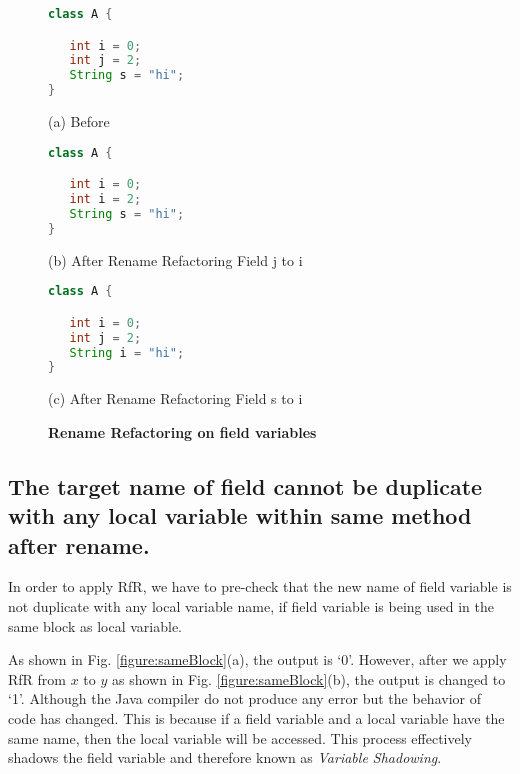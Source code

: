 \begin{figure}[th]
\centering	
\begin{minipage}[t]{0.45\linewidth}
\begin{lstlisting}[language=java, basicstyle=\scriptsize\ttfamily,frame=single]
class A {

   int i = 0;
   int j = 2;
   String s = "hi";
}

\end{lstlisting}
\centering(a) Before
\end{minipage}
\hfill
\begin{minipage}[t]{0.45\linewidth}
\begin{lstlisting}[language=java, basicstyle=\scriptsize\ttfamily,frame=single]
class A {

   int i = 0;
   int i = 2;
   String s = "hi";
}
\end{lstlisting}
\centering(b) After Rename Refactoring Field j to i
\end{minipage}

\centering
\begin{minipage}[t]{0.45\linewidth}
\begin{lstlisting}[language=java, basicstyle=\scriptsize\ttfamily,frame=single]
class A {

   int i = 0;
   int j = 2;
   String i = "hi";
}
\end{lstlisting}
\centering(c) After Rename Refactoring Field s to i
\end{minipage}
\caption{\textbf{Rename Refactoring on field variables}}
\label{figure:field}
\end{figure}


\subsection{The target name of field cannot be duplicate with any local variable within same method after rename.}
In order to apply RfR,  we have to pre-check that the new name of field variable is not duplicate with any local variable name, if field variable is being used in the same block as local variable. 

As shown in Fig. \ref{figure:sameBlock}(a), the output is `0'. However, after we apply RfR from $x$ to $y$ as shown in Fig. \ref{figure:sameBlock}(b), the output is changed to `1'. Although the Java compiler do not produce any error but the behavior of code has changed. This is because if a field variable and a local variable have the same name, then the local variable will be accessed. This process effectively shadows the field variable and therefore known as \textit{Variable Shadowing}. 

